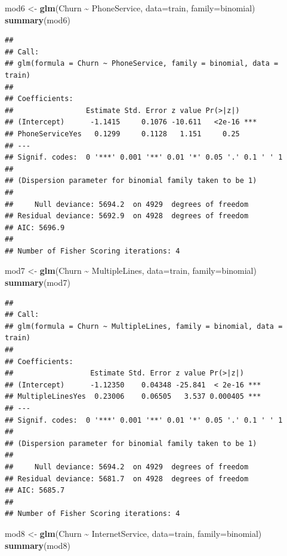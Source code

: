 \documentclass[
  twoside]{article}
\newenvironment{Shaded}{\begin{snugshade}}{\end{snugshade}}
\newcommand{\AttributeTok}[1]{\textcolor[rgb]{0.13,0.29,0.53}{#1}}
\newcommand{\FunctionTok}[1]{\textcolor[rgb]{0.13,0.29,0.53}{\textbf{#1}}}
\newcommand{\NormalTok}[1]{#1}
\newcommand{\OtherTok}[1]{\textcolor[rgb]{0.56,0.35,0.01}{#1}}
\newcommand{\SpecialCharTok}[1]{\textcolor[rgb]{0.81,0.36,0.00}{\textbf{#1}}}
\begin{document}
\begin{Shaded}
\begin{Highlighting}[]
\NormalTok{mod6 }\OtherTok{\textless{}{-}} \FunctionTok{glm}\NormalTok{(Churn }\SpecialCharTok{\textasciitilde{}}\NormalTok{ PhoneService, }\AttributeTok{data=}\NormalTok{train, }\AttributeTok{family=}\NormalTok{binomial)}
\FunctionTok{summary}\NormalTok{(mod6)}
\end{Highlighting}
\end{Shaded}

\begin{verbatim}
## 
## Call:
## glm(formula = Churn ~ PhoneService, family = binomial, data = train)
## 
## Coefficients:
##                 Estimate Std. Error z value Pr(>|z|)    
## (Intercept)      -1.1415     0.1076 -10.611   <2e-16 ***
## PhoneServiceYes   0.1299     0.1128   1.151     0.25    
## ---
## Signif. codes:  0 '***' 0.001 '**' 0.01 '*' 0.05 '.' 0.1 ' ' 1
## 
## (Dispersion parameter for binomial family taken to be 1)
## 
##     Null deviance: 5694.2  on 4929  degrees of freedom
## Residual deviance: 5692.9  on 4928  degrees of freedom
## AIC: 5696.9
## 
## Number of Fisher Scoring iterations: 4
\end{verbatim}

\begin{Shaded}
\begin{Highlighting}[]
\NormalTok{mod7 }\OtherTok{\textless{}{-}} \FunctionTok{glm}\NormalTok{(Churn }\SpecialCharTok{\textasciitilde{}}\NormalTok{ MultipleLines, }\AttributeTok{data=}\NormalTok{train, }\AttributeTok{family=}\NormalTok{binomial)}
\FunctionTok{summary}\NormalTok{(mod7)}
\end{Highlighting}
\end{Shaded}

\begin{verbatim}
## 
## Call:
## glm(formula = Churn ~ MultipleLines, family = binomial, data = train)
## 
## Coefficients:
##                  Estimate Std. Error z value Pr(>|z|)    
## (Intercept)      -1.12350    0.04348 -25.841  < 2e-16 ***
## MultipleLinesYes  0.23006    0.06505   3.537 0.000405 ***
## ---
## Signif. codes:  0 '***' 0.001 '**' 0.01 '*' 0.05 '.' 0.1 ' ' 1
## 
## (Dispersion parameter for binomial family taken to be 1)
## 
##     Null deviance: 5694.2  on 4929  degrees of freedom
## Residual deviance: 5681.7  on 4928  degrees of freedom
## AIC: 5685.7
## 
## Number of Fisher Scoring iterations: 4
\end{verbatim}

\begin{Shaded}
\begin{Highlighting}[]
\NormalTok{mod8 }\OtherTok{\textless{}{-}} \FunctionTok{glm}\NormalTok{(Churn }\SpecialCharTok{\textasciitilde{}}\NormalTok{ InternetService, }\AttributeTok{data=}\NormalTok{train, }\AttributeTok{family=}\NormalTok{binomial)}
\FunctionTok{summary}\NormalTok{(mod8)}
\end{Highlighting}
\end{Shaded}
\end{document}
